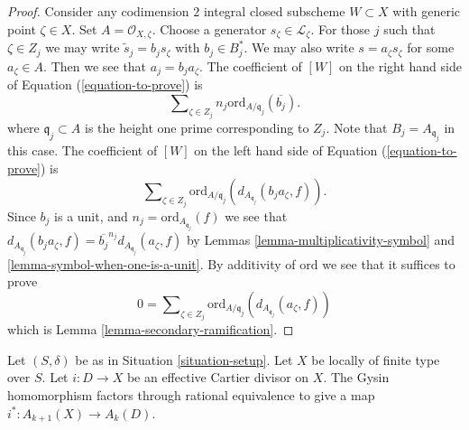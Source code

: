 \begin{proof}
\medskip\noindent
Consider any codimension $2$
integral closed subscheme $W \subset X$ with generic point $\zeta \in X$.
Set $A = \mathcal{O}_{X, \zeta}$. Choose a generator
$s_\zeta \in \mathcal{L}_\zeta$. For those $j$ such that
$\zeta \in Z_j$ we may write $\tilde s_j = b_j s_\zeta$ with
$b_j \in B_j^*$. We may also write $s = a_\zeta s_\zeta$ for
some $a_\zeta \in A$. Then we see that $a_j = b_j a_\zeta$.
The coefficient of $[W]$ on the right hand side of
Equation (\ref{equation-to-prove}) is
$$
\sum\nolimits_{\zeta \in Z_j} n_j\text{ord}_{A/\mathfrak q_j}(\overline{b_j}).
$$
where $\mathfrak q_j \subset A$ is the height one prime corresponding
to $Z_j$. Note that $B_j = A_{\mathfrak q_j}$ in this case.
The coefficient of $[W]$ on the left hand side of
Equation (\ref{equation-to-prove}) is
$$
\sum\nolimits_{\zeta \in Z_j}
\text{ord}_{A/\mathfrak q_j}(d_{A_{\mathfrak q_j}}(b_j a_\zeta, f)).
$$
Since $b_j$ is a unit, and $n_j = \text{ord}_{A_{\mathfrak q_j}}(f)$
we see that $d_{A_{\mathfrak q_j}}(b_j a_\zeta, f)
= \overline{b_j}^{n_j} d_{A_{\mathfrak q_j}}(a_\zeta, f)$ by
Lemmas \ref{lemma-multiplicativity-symbol}
and \ref{lemma-symbol-when-one-is-a-unit}.
By additivity of $\text{ord}$ we see that it suffices to prove
$$
0 = \sum\nolimits_{\zeta \in Z_j}
\text{ord}_{A/\mathfrak q_j}(d_{A_{\mathfrak q_j}}(a_\zeta, f))
$$
which is Lemma \ref{lemma-secondary-ramification}.
\end{proof}

\begin{lemma}
\label{lemma-gysin-factors}
Let $(S, \delta)$ be as in Situation \ref{situation-setup}.
Let $X$ be locally of finite type over $S$.
Let $i : D \to X$ be an effective Cartier divisor on $X$.
The Gysin homomorphism factors through rational equivalence to
give a map $i^* : A_{k + 1}(X) \to A_k(D)$.
\end{lemma}

